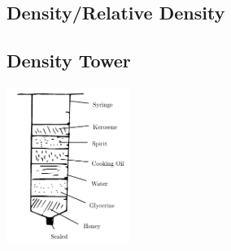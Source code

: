 \begin{multicols}{2}

\section*{Density/Relative Density}




\subsection{Density Tower}
\label{sub:density-column}

\begin{center}
\includegraphics[width=0.3\textwidth]{./img/density-tower.png}
\end{center}


\end{multicols}
